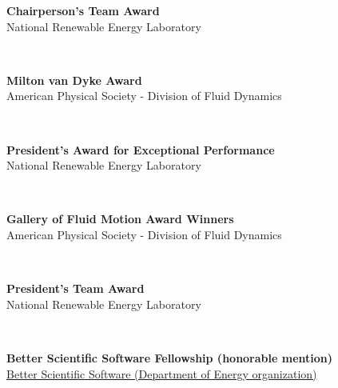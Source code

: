 \documentclass[11pt,letterpaper]{article}
\begin{document}
\begin{minipage}[t]{0.82\textwidth}%
  \textbf{Chairperson’s Team Award}\\%
  National Renewable Energy Laboratory%
\end{minipage}\hfill%
\begin{minipage}[t]{0.15\textwidth}%
\end{minipage}\\[2ex]%
\begin{minipage}[t]{0.82\textwidth}%
  \textbf{Milton van Dyke Award}\\%
  American Physical Society - Division of Fluid Dynamics%
\end{minipage}\hfill%
\begin{minipage}[t]{0.15\textwidth}%
\end{minipage}\\[2ex]%
\begin{minipage}[t]{0.82\textwidth}%
  \textbf{President’s Award for Exceptional Performance}\\%
  National Renewable Energy Laboratory%
\end{minipage}\hfill%
\begin{minipage}[t]{0.15\textwidth}%
\end{minipage}\\[2ex]%
\begin{minipage}[t]{0.82\textwidth}%
  \textbf{Gallery of Fluid Motion Award Winners}\\%
  American Physical Society - Division of Fluid Dynamics%
\end{minipage}\hfill%
\begin{minipage}[t]{0.15\textwidth}%
\end{minipage}\\[2ex]%
\begin{minipage}[t]{0.82\textwidth}%
  \textbf{President’s Team Award}\\%
  National Renewable Energy Laboratory%
\end{minipage}\hfill%
\begin{minipage}[t]{0.15\textwidth}%
\end{minipage}\\[2ex]%
\begin{minipage}[t]{0.82\textwidth}%
  \textbf{Better Scientific Software Fellowship (honorable mention)}\\%
  \href{https://bssw.io/blog_posts/introducing-the-2018-bssw-fellows}{Better Scientific Software (Department of Energy organization)}%
\end{minipage}\hfill%
\end{document}
